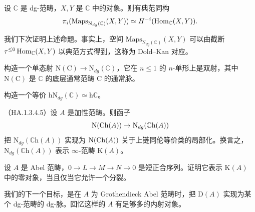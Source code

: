 
\begin{proposition}\label{L17-2.16}
设 $\mathbb{C}$ 是 dg-范畴，$X,Y$ 是 $\mathbb{C}$ 中的对象。则有典范同构
\[
\pi_i(\mathrm{Maps}_{\mathrm{N}_{dg}(\mathbb{C})}(X,Y))\simeq H^{-i}(\operatorname{Hom}_{\mathbb{C}}(X,Y)).
\]
\end{proposition}

\begin{remark}\label{L17-2.17}
我们下次证明上述命题。事实上，空间 $\mathrm{Maps}_{\mathrm{N}_{dg}(\mathbb{C})}(X,Y)$ 可以由截断 $\tau^{\le0}\operatorname{Hom}_{\mathbb{C}}(X,Y)$ 以典范方式得到，这称为 Dold–Kan 对应。
\end{remark}

\begin{exercise}\label{L17-2.18}
构造一个单态射 $\mathrm{N}(\mathrm{C})\to\mathrm{N}_{dg}(\mathbb{C})$，它在 $n\le1$ 的 $n$-单形上是双射，其中 $\mathrm{N}(\mathrm{C})$ 是 $\mathbb{C}$ 的底层通常范畴 $\mathrm{C}$ 的通常脉。
\end{exercise}

\begin{exercise}\label{L17-2.19}
构造一个等价 $\mathrm{hN}_{dg}(\mathbb{C})\simeq\mathrm{h}\mathbb{C}$。
\end{exercise}

\begin{proposition}\label{L17-2.20}
（HA.1.3.4.5）设 $A$ 是加性范畴。则函子
\[
\mathrm{N}(\operatorname{Ch}(A))\to\mathrm{N}_{dg}(\mathbb{C}\mathrm{h}(A))
\]
把 $\mathrm{N}_{dg}(\mathbb{C}\mathrm{h}(A))$ 实现为 $\mathrm{N}(\operatorname{Ch}(A))$ 关于上链同伦等价类的局部化。换言之，$\mathrm{N}_{dg}(\mathbb{C}\mathrm{h}(A))$ 表示 $\infty$-范畴 $\mathrm{K}(A)$。
\end{proposition}

\begin{exercise}\label{L17-2.21}
设 $A$ 是 Abel 范畴，$0\to L\to M\to N\to 0$ 是短正合序列。证明它表示 $\mathrm{K}(A)$ 中的零对象，当且仅当它允许一个分裂。
\end{exercise}

\nitem\label{L17-2.22} 我们的下一个目标，是在 $A$ 为 Grothendieck Abel 范畴时，把 $\mathrm{D}(A)$ 实现为某个 dg-范畴的 dg-脉。回忆这样的 $A$ 有足够多的内射对象。

